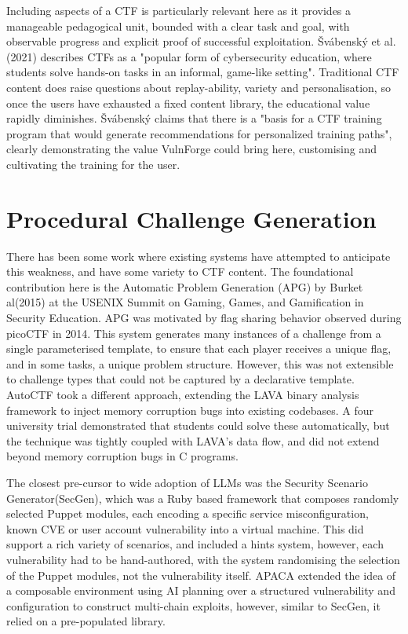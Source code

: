 Including aspects of a CTF is particularly relevant here as it provides a manageable pedagogical unit, bounded with a clear task and goal, with observable progress and explicit proof of successful exploitation. Švábenský et al. (2021)\cite{svabensky_automated_2024} describes CTFs as a "popular form of cybersecurity education, where students solve hands-on tasks in an informal, game-like setting". Traditional CTF content does raise questions about replay-ability, variety and personalisation, so once the users have exhausted a fixed content library, the educational value rapidly diminishes. Švábenský claims that there is a "basis for a CTF training program that would generate
recommendations for personalized training paths", clearly demonstrating the value VulnForge could bring here, customising and cultivating the training for the user. 

\section{Procedural Challenge Generation}\label{sec:procedural}
There has been some work where existing systems have attempted to anticipate this weakness, and have some variety to CTF content. The foundational contribution here is the Automatic Problem Generation (APG) by Burket al(2015) at the USENIX Summit on Gaming, Games, and Gamification in Security Education\cite{burket_automatic_2015}. APG was motivated by flag sharing behavior observed during picoCTF in 2014. This system generates many instances of a challenge from a single parameterised template, to ensure that each player receives a unique flag, and in some tasks, a unique problem structure. However, this was not extensible to challenge types that could not be captured by a declarative template. AutoCTF took a different approach, extending the LAVA binary analysis framework to inject memory corruption bugs into existing codebases. A four university trial demonstrated that students could solve these automatically, but the technique was tightly coupled with LAVA's data flow, and did not extend beyond memory corruption bugs in C programs. 

The closest pre-cursor to wide adoption of LLMs was the Security Scenario Generator\cite{schreuders_security_nodate}(SecGen), which was a Ruby based framework that composes randomly selected Puppet modules, each encoding a specific service misconfiguration, known CVE or user account vulnerability into a virtual machine. This did support a rich variety of scenarios, and included a hints system, however, each vulnerability had to be hand-authored, with the system randomising the selection of the Puppet modules, not the vulnerability itself. APACA\cite{eckroth_alpaca_2019} extended the idea of a composable environment using AI planning over a structured vulnerability and configuration to construct multi-chain exploits, however, similar to SecGen, it relied on a pre-populated library. 

